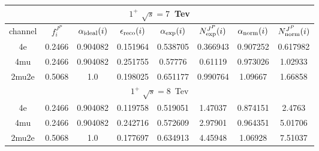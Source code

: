 \begin{table}[b]
\begin{tabular}{c c c c c c c c}
 \multicolumn{8}{|c|}{$1^{+}$ $\sqrt{s}=7$~Tev} \\ \hline 

channel & $f_{i}^{J^P}$ & $\alpha_{\rm ideal} (i)$ & $\epsilon_{\rm reco} (i)$ & $\alpha_{\rm exp} (i)$ & $N^{J^P}_{\rm exp} (i)$ & $\alpha_{\rm norm} (i)$ & $N^{J^P}_{\rm norm} (i)$\\ \hline 
4e & 0.2466 & 0.904082 & 0.151964 & 0.538705
 & 0.366943%
 & 0.907252 & 0.617982 \\ \hline 
4mu & 0.2466 & 0.904082 & 0.251755 & 0.57776
 & 0.61119%
 & 0.973026 & 1.02933 \\ \hline 
2mu2e & 0.5068 & 1.0  & 0.198025 & 0.651177
 & 0.990764%
 & 1.09667 & 1.66858 \\ \hline \hline 

 \multicolumn{8}{|c|}{$1^{+}$ $\sqrt{s}=8$~Tev} \\ \hline 

4e & 0.2466 & 0.904082 & 0.119758 & 0.519051
 & 1.47037%
 & 0.874151 & 2.4763 \\ \hline 
4mu & 0.2466 & 0.904082 & 0.242716 & 0.572609
 & 2.97901%
 & 0.964351 & 5.01706 \\ \hline 
2mu2e & 0.5068 & 1.0  & 0.177697 & 0.634913
 & 4.45948%
 & 1.06928 & 7.51037 \\ \hline \hline 
\end{tabular}
\label{table:HZZ4lyieldcorr_spin1}
\end{table}

